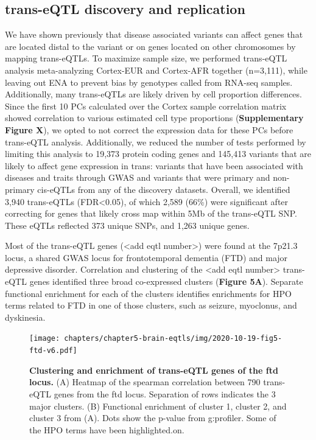 \subsection{trans-eQTL discovery and replication}
We have shown previously that disease associated variants can affect genes that are located distal to the variant or on genes located on other chromosomes by mapping trans-eQTLs. To maximize sample size, we performed trans-eQTL analysis meta-analyzing Cortex-EUR and Cortex-AFR together (n=3,111), while leaving out ENA to prevent bias by genotypes called from RNA-seq samples. Additionally, many trans-eQTLs are likely driven by cell proportion differences. Since the first 10 PCs calculated over the Cortex sample correlation matrix showed correlation to various estimated cell type proportions (\textbf{Supplementary Figure X}), we opted to not correct the expression data for these PCs before trans-eQTL analysis. Additionally, we reduced the number of tests performed by limiting this analysis to 19,373 protein coding genes and 145,413 variants that are likely to affect gene expression in trans: variants that have been associated with diseases and traits through GWAS and variants that were primary and non-primary cis-eQTLs from any of the discovery datasets. Overall, we identified 3,940 trans-eQTLs (FDR<0.05), of which 2,589 (66\%) were significant after correcting for genes that likely cross map within 5Mb of the trans-eQTL SNP. These eQTLs reflected 373 unique SNPs, and 1,263 unique genes.  

Most of the trans-eQTL genes (<add eqtl number>) were found at the 7p21.3 locus, a shared GWAS locus for frontotemporal dementia (FTD) and major depressive disorder. Correlation and clustering of the <add eqtl number> trans-eQTL genes identified three broad co-expressed clusters (\textbf{Figure 5A}). Separate functional enrichment for each of the clusters identifies enrichments for HPO terms related to FTD in one of those clusters, such as seizure, myoclonus, and dyskinesia.  

\begin{figure}[H]
	\texttt{[image: chapters/chapter5-brain-eqtls/img/2020-10-19-fig5-ftd-v6.pdf]}
	\caption{\textbf{Clustering and enrichment of trans-eQTL genes of the ftd locus.} (A) Heatmap of the spearman correlation between 790 trans-eQTL genes from the ftd locus. Separation of rows indicates the 3 major clusters. (B) Functional enrichment of cluster 1, cluster 2, and cluster 3 from (A). Dots show the p-value from g:profiler. Some of the HPO terms have been highlighted.on.}
\end{figure}


